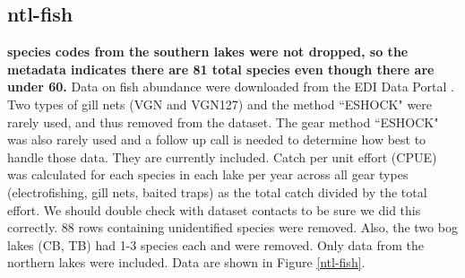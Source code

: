 \documentclass[11pt, oneside]{article}
\begin{document}
\subsection {ntl-fish}
{\bf species codes from the southern lakes were not dropped, so the metadata indicates there are 81 total species even though there are under 60.}
Data on fish abundance were downloaded from the EDI Data Portal \citep{ntl-fish}.
Two types of gill nets (VGN and VGN127) and the method  ``ESHOCK" were rarely used, and thus removed from the dataset.%
The gear method ``ESHOCK" was also rarely used and a follow up call is needed to determine how best to handle those data.
They are currently included.
Catch per unit effort (CPUE) was calculated for each species in each lake per year across all gear types (electrofishing, gill nets, baited traps) as the total catch divided by the total effort.
We should double check with dataset contacts to be sure we did this correctly.
88 rows containing unidentified species were removed.
Also, the two bog lakes (CB, TB) had 1-3 species each and were removed. 
Only data from the northern lakes were included.
Data are shown in Figure \ref{ntl-fish}.
\end{document}
